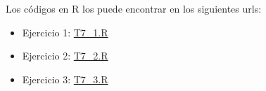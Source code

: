 \documentclass[12pt]{article}
\begin{document}

 \pagebreak
 \pagebreak
 \pagebreak
Los códigos en R los puede encontrar en los siguientes urls:
\begin{itemize}
    \item Ejercicio 1: \href{https://github.com/Hamgalex/MetodosEstadisticosMultivariados/blob/main/T7/E1.R}{T7\_1.R}
    \item Ejercicio 2: \href{https://github.com/Hamgalex/MetodosEstadisticosMultivariados/blob/main/T7/E2.R}{T7\_2.R}
    \item Ejercicio 3: \href{https://github.com/Hamgalex/MetodosEstadisticosMultivariados/blob/main/T7/E3.R}{T7\_3.R}
\end{itemize}


\end{document}
